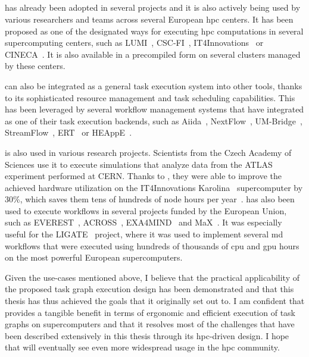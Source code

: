 \vspace{-2mm}\subsection*{\hyperqueue{}}
\hyperqueue{} has already been adopted in several projects and it is also actively
being used by various researchers and teams across several European \gls{hpc}
centers. It has been proposed as one of the designated ways for executing
\gls{hpc} computations in several supercomputing centers, such as
LUMI~\cite{it4i-lumi}, CSC-FI~\cite{puhti-hq,puhti-hq-2},
IT4Innovations~\cite{it4i-hq} or CINECA~\cite{cineca}. It is also
available in a precompiled form on several clusters managed by these centers.

\hyperqueue{} can also be integrated as a general task execution system into other
tools, thanks to its sophisticated resource management and task scheduling capabilities. This has
been leveraged by several workflow management systems that have integrated
\hyperqueue{} as one of their task execution backends, such as
Aiida~\cite{aiida-hq}, NextFlow~\cite{nextflow-hq},
UM-Bridge~\cite{umbridge}, StreamFlow~\cite{streamflow-hq},
ERT~\cite{ert} or HEAppE~\cite{heappe_hq}.

\hyperqueue{} is also used in various research projects. Scientists from the Czech
Academy of Sciences use it to execute simulations that analyze data from the
ATLAS~\cite{atlas} experiment performed at CERN. Thanks to
\hyperqueue{}, they were able to improve the achieved hardware utilization on the
IT4Innovations Karolina~\cite{karolina} supercomputer by 30\%, which saves them tens of
hundreds of node hours per year~\cite{cern-hq}. \hyperqueue{} has also
been used to execute workflows in several projects funded by the European Union, such as
EVEREST~\cite{everest}, ACROSS~\cite{across},
EXA4MIND~\cite{exa4mind} and MaX~\cite{max}. It was especially useful
for the LIGATE~\cite{ligate} project, where it was used to implement several
\gls{md} workflows that were executed using hundreds of thousands of
\gls{cpu} and \gls{gpu} hours on the most powerful European
supercomputers.

Given the use-cases mentioned above, I believe that the practical applicability of the proposed
task graph execution design has been demonstrated and that this thesis has thus achieved the goals
that it originally set out to. I am confident that \hyperqueue{} provides a tangible
benefit in terms of ergonomic and efficient execution of task graphs on supercomputers and that it
resolves most of the challenges that have been described extensively in this thesis through its
\gls{hpc}-driven design. I hope that \hyperqueue{} will eventually
see even more widespread usage in the \gls{hpc} community.

